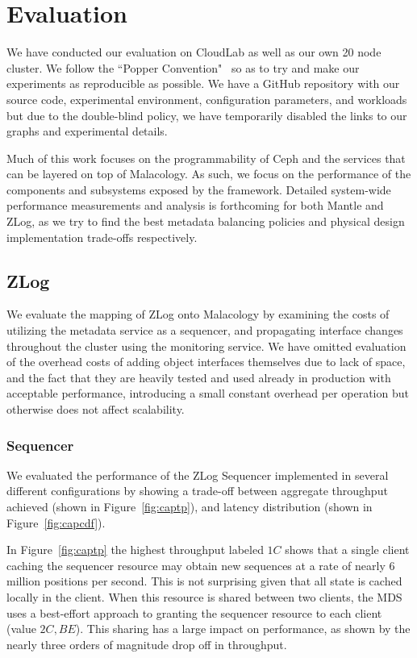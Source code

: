 \documentclass[preprint]{sigplanconf-eurosys}
\begin{document}
\section{Evaluation} \label{evaluation} We have conducted our evaluation on
CloudLab as well as our own 20 node cluster. We follow the ``Popper
Convention"~\cite{anonymous} so as to try and make our experiments as
reproducible as possible. We have a GitHub repository with our source code,
experimental environment, configuration parameters, and workloads but due to
the double-blind policy, we have temporarily disabled the links to our graphs
and experimental details.

Much of this work focuses on the programmability of Ceph and the services that
can be layered on top of Malacology. As such, we focus on the performance of
the components and subsystems exposed by the framework. Detailed system-wide
performance measurements and analysis is forthcoming for both Mantle and ZLog,
as we try to find the best metadata balancing policies and physical design
implementation trade-offs respectively.

\subsection{ZLog}

We evaluate the mapping of ZLog onto Malacology by examining the costs of
utilizing the metadata service as a sequencer, and propagating interface
changes throughout the cluster using the monitoring service. We have omitted
evaluation of the overhead costs of adding object interfaces themselves due to
lack of space, and the fact that they are heavily tested and used already in
production with acceptable performance, introducing a small constant overhead
per operation but otherwise does not affect scalability.

\subsubsection{Sequencer}

We evaluated the performance of the ZLog Sequencer implemented in several
different configurations by showing a trade-off between aggregate throughput
achieved (shown in Figure~\ref{fig:captp}), and latency distribution (shown in
Figure~\ref{fig:capcdf}).

In Figure~\ref{fig:captp} the highest throughput labeled $1C$ shows that a
single client caching the sequencer resource may obtain new sequences at a rate
of nearly 6 million positions per second. This is not surprising given that all
state is cached locally in the client. When this resource is shared between two
clients, the MDS uses a best-effort approach to granting the sequencer resource
to each client (value $2C,BE$). This sharing has a large impact on performance,
as shown by the nearly three orders of magnitude drop off in throughput.
\end{document}
